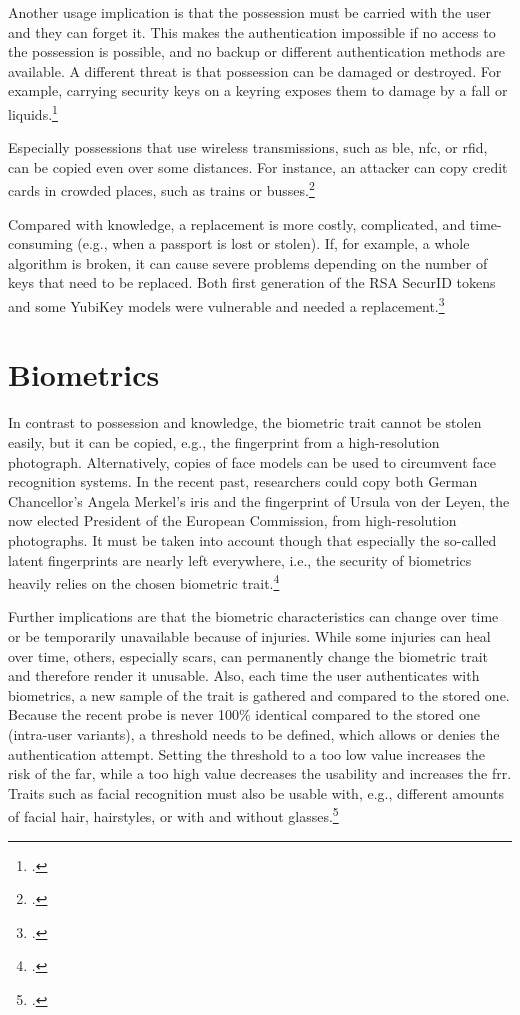 Another usage implication is that the possession must be carried with the user and they can forget it. This makes the authentication impossible if no access to the possession is possible, and no backup or different authentication methods are available. A different threat is that possession can be damaged or destroyed. For example, carrying security keys on a keyring exposes them to damage by a fall or liquids.\footcites[See][263--264]{shostack2014threat}

Especially possessions that use wireless transmissions, such as \gls{ble}, \gls{nfc}, or \gls{rfid}, can be copied even over some distances. For instance, an attacker can copy credit cards in crowded places, such as trains or busses.\footcite[See][2--3]{6892730}

Compared with knowledge, a replacement is more costly, complicated, and time-consuming (e.g., when a passport is lost or stolen). If, for example, a whole algorithm is broken, it can cause severe problems depending on the number of keys that need to be replaced. Both first generation of the RSA SecurID tokens and some YubiKey models were vulnerable and needed a replacement.\footcites[See][18]{dasgupta2017multi}[See][364--265]{BIRYUKOV2005364}[See][]{yubikey-heise}

\section{Biometrics}

In contrast to possession and knowledge, the biometric trait cannot be stolen easily, but it can be copied, e.g., the fingerprint from a high-resolution photograph. Alternatively, copies of face models can be used to circumvent face recognition systems. In the recent past, researchers could copy both German Chancellor's Angela Merkel's iris and the fingerprint of Ursula von der Leyen, the now elected President of the European Commission, from high-resolution photographs. It must be taken into account though that especially the so-called latent fingerprints are nearly left everywhere, i.e., the security of biometrics heavily relies on the chosen biometric trait.\footcites[See][7--8]{185181}[See][7--8]{220566}[See][p. e199]{MARTIN2013e189}[See][]{ccc-merkel}

Further implications are that the biometric characteristics can change over time or be temporarily unavailable because of injuries. While some injuries can heal over time, others, especially scars, can permanently change the biometric trait and therefore render it unusable. Also, each time the user authenticates with biometrics, a new sample of the trait is gathered and compared to the stored one. Because the recent probe is never 100\% identical compared to the stored one (\frqq intra-user variants\flqq), a threshold needs to be defined, which allows or denies the authentication attempt. Setting the threshold to a too low value increases the risk of the \gls{far}, while a too high value decreases the usability and increases the \gls{frr}. Traits such as facial recognition must also be usable with, e.g., different amounts of facial hair, hairstyles, or with and without glasses.\footcites[See][13--17, 52, 98]{Jain2011}

